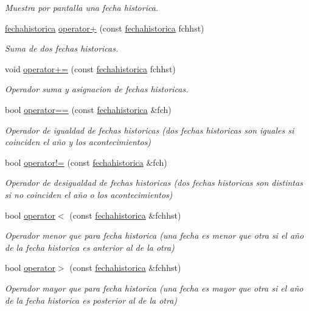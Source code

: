 \begin{DoxyCompactItemize}
\begin{DoxyCompactList}\small\item\em Muestra por pantalla una fecha historica. \end{DoxyCompactList}\item 
\hyperlink{classfechahistorica}{fechahistorica} \hyperlink{classfechahistorica_ac0dd468d211535f90c2ad5b27835137d}{operator+} (const \hyperlink{classfechahistorica}{fechahistorica} fchhst)
\begin{DoxyCompactList}\small\item\em Suma de dos fechas historicas. \end{DoxyCompactList}\item 
void \hyperlink{classfechahistorica_a2b33f3329c8d976f1ddbc88eef88a7b8}{operator+=} (const \hyperlink{classfechahistorica}{fechahistorica} fchhst)
\begin{DoxyCompactList}\small\item\em Operador suma y asignacion de fechas historicas. \end{DoxyCompactList}\item 
bool \hyperlink{classfechahistorica_a134af97e2c094f89c0d854a20035ed25}{operator==} (const \hyperlink{classfechahistorica}{fechahistorica} \&fch)
\begin{DoxyCompactList}\small\item\em Operador de igualdad de fechas historicas (dos fechas historicas son iguales si coinciden el año y los acontecimientos) \end{DoxyCompactList}\item 
bool \hyperlink{classfechahistorica_ad64196a78426f1944d161786a44939f3}{operator!=} (const \hyperlink{classfechahistorica}{fechahistorica} \&fch)
\begin{DoxyCompactList}\small\item\em Operador de desigualdad de fechas historicas (dos fechas historicas son distintas si no coinciden el año o los acontecimientos) \end{DoxyCompactList}\item 
bool \hyperlink{classfechahistorica_a910b581b3af2a27b0d9c0236969c7dc2}{operator$<$} (const \hyperlink{classfechahistorica}{fechahistorica} \&fchhst)
\begin{DoxyCompactList}\small\item\em Operador menor que para fecha historica (una fecha es menor que otra si el año de la fecha historica es anterior al de la otra) \end{DoxyCompactList}\item 
bool \hyperlink{classfechahistorica_acea65372272de7f97881cd99430b3cff}{operator$>$} (const \hyperlink{classfechahistorica}{fechahistorica} \&fchhst)
\begin{DoxyCompactList}\small\item\em Operador mayor que para fecha historica (una fecha es mayor que otra si el año de la fecha historica es posterior al de la otra) \end{DoxyCompactList}\end{DoxyCompactItemize}
